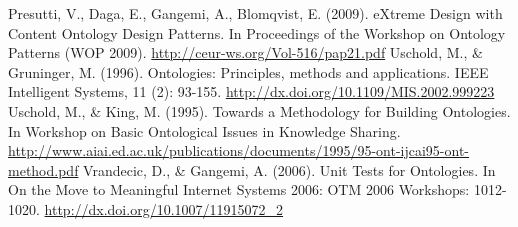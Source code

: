 \documentclass[runningheads,a4paper]{llncs}
\begin{document}
\begin{thebibliography}{4}
 Presutti, V., Daga, E., Gangemi, A., Blomqvist, E. (2009). eXtreme Design with Content Ontology Design Patterns. In Proceedings of the Workshop on Ontology Patterns (WOP 2009). \url{http://ceur-ws.org/Vol-516/pap21.pdf}
 Uschold, M., \& Gruninger, M. (1996). Ontologies: Principles, methods and applications. IEEE Intelligent Systems, 11 (2): 93-155. \url{http://dx.doi.org/10.1109/MIS.2002.999223}
 Uschold, M., \& King, M. (1995). Towards a Methodology for Building Ontologies. In Workshop on Basic Ontological Issues in Knowledge Sharing. \url{http://www.aiai.ed.ac.uk/publications/documents/1995/95-ont-ijcai95-ont-method.pdf}
 Vrandecic, D., \& Gangemi, A. (2006). Unit Tests for Ontologies. In On the Move to Meaningful Internet Systems 2006: OTM 2006 Workshops: 1012-1020. \url{http://dx.doi.org/10.1007/11915072\_2}

\end{thebibliography}
\end{document}
